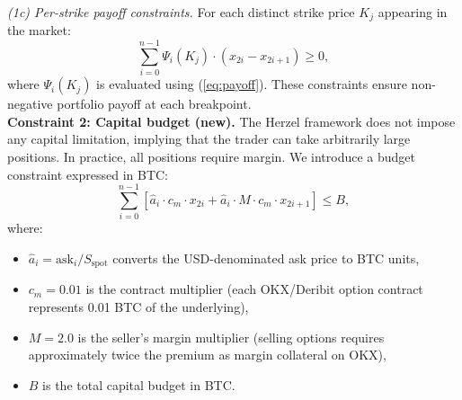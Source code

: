 \documentclass[openany]{book}
\numberwithin{figure}{chapter}
\numberwithin{equation}{chapter}
\begin{document}
\textit{(1c) Per-strike payoff constraints.} For each distinct strike price $K_j$ appearing in the market:
\begin{equation}
\sum_{i=0}^{n-1} \Psi_i(K_j) \cdot (x_{2i} - x_{2i+1}) \geq 0,
\label{eq:per_strike}
\end{equation}
where $\Psi_i(K_j)$ is evaluated using (\ref{eq:payoff}). These constraints ensure non-negative portfolio payoff at each breakpoint.\\


\textbf{Constraint 2: Capital budget (new).} The Herzel framework does not impose any capital limitation, implying that the trader can take arbitrarily large positions. In practice, all positions require margin. We introduce a budget constraint expressed in BTC:
\begin{equation}
\sum_{i=0}^{n-1} \left[ \hat{a}_i \cdot c_m \cdot x_{2i} + \hat{a}_i \cdot M \cdot c_m \cdot x_{2i+1} \right] \leq B,
\label{eq:budget}
\end{equation}
where:
\begin{itemize}
    \item $\hat{a}_i = \text{ask}_i / S_{\text{spot}}$ converts the USD-denominated ask price to BTC units,
    \item $c_m = 0.01$ is the contract multiplier (each OKX/Deribit option contract represents 0.01 BTC of the underlying),
    \item $M = 2.0$ is the seller's margin multiplier (selling options requires approximately twice the premium as margin collateral on OKX),
    \item $B$ is the total capital budget in BTC.
\end{itemize}

\end{document}

